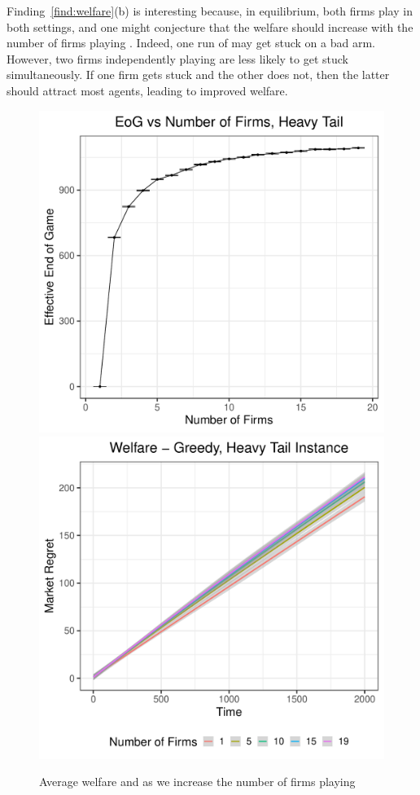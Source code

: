 \documentclass[../competing_bandits_with_appendix.tex]{subfiles}
\begin{document}
Finding~\ref{find:welfare}(b) is interesting because, in equilibrium, both firms play \DG in both settings, and one might conjecture that the welfare should increase with the number of firms playing \DG. Indeed, one run of \DG may get stuck on a bad arm. However, two firms independently playing \DG are less likely to get stuck simultaneously. If one firm gets stuck and the other does not, then the latter should attract most agents, leading to improved welfare.
\begin{figure}
\centering
\includegraphics[scale=0.3]{ec19paper/figures/eeog_vs_num_firms_ht}
\includegraphics[scale=0.3]{ec19paper/figures/ht_many_firm_welfare}\\
\caption{Average welfare and \Eeog as we increase the number of firms playing \DG}
\label{many_firm_welfare}
\end{figure}
\end{document}
